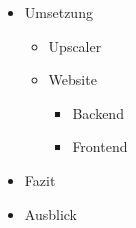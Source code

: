 \begin{onehalfspace}
\begin{itemize}
	\item Umsetzung
	\begin{itemize}
		\item Upscaler
		\item Website
		\begin{itemize}
			\item Backend
			\item Frontend
		\end{itemize}
	\end{itemize}
	
	\item Fazit
	\item Ausblick
	
\end{itemize}


\end{onehalfspace}
